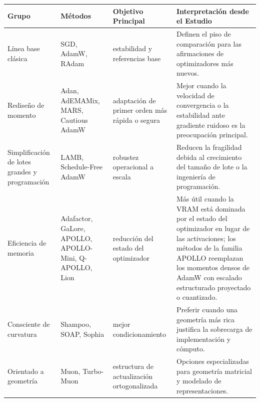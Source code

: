 \small
\begin{longtable}{p{2.5cm}p{3.5cm}p{2.0cm}p{5.3cm}}
\toprule
\textbf{Grupo} & \textbf{Métodos} & \textbf{Objetivo Principal} & \textbf{Interpretación desde el Estudio} \\
\midrule
\endhead
Línea base clásica & SGD, AdamW, RAdam & estabilidad y referencias base & Definen el piso de comparación para las afirmaciones de optimizadores más nuevos. \\
Rediseño de momento & Adan, AdEMAMix, MARS, Cautious AdamW & adaptación de primer orden más rápida o segura & Mejor cuando la velocidad de convergencia o la estabilidad ante gradiente ruidoso es la preocupación principal. \\
Simplificación de lotes grandes y programación & LAMB, Schedule-Free AdamW & robustez operacional a escala & Reducen la fragilidad debida al crecimiento del tamaño de lote o la ingeniería de programación. \\
Eficiencia de memoria & Adafactor, GaLore, APOLLO, APOLLO-Mini, Q-APOLLO, Lion & reducción del estado del optimizador & Más útil cuando la VRAM está dominada por el estado del optimizador en lugar de las activaciones; los métodos de la familia APOLLO reemplazan los momentos densos de AdamW con escalado estructurado proyectado o cuantizado. \\
Consciente de curvatura & Shampoo, SOAP, Sophia & mejor condicionamiento & Preferir cuando una geometría más rica justifica la sobrecarga de implementación y cómputo. \\
Orientado a geometría & Muon, Turbo-Muon & estructura de actualización ortogonalizada & Opciones especializadas para geometría matricial y modelado de representaciones. \\
\bottomrule
\end{longtable}
\normalsize

